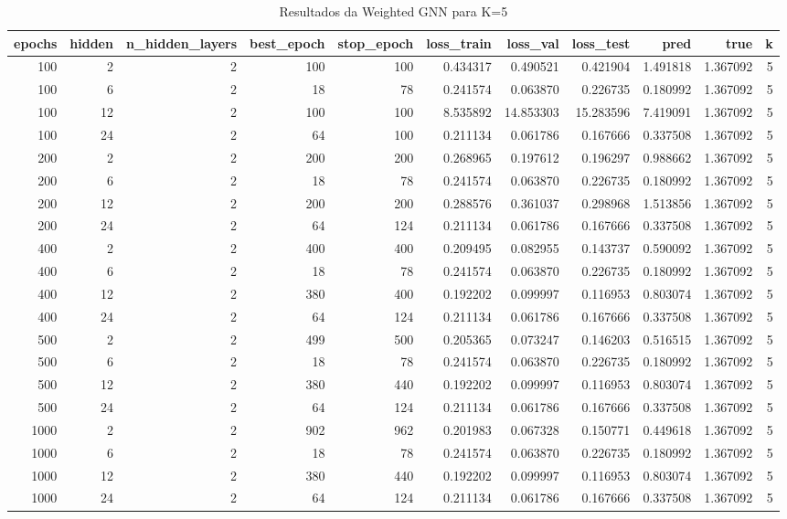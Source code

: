 \begin{table}
\caption{Resultados da Weighted GNN para K=5}
\label{tab:weighted_gnn_results_k5}
\begin{tabular}{rrrrrrrrrrr}
\toprule
epochs & hidden & n\_hidden\_layers & best\_epoch & stop\_epoch & loss\_train & loss\_val & loss\_test & pred & true & k \\
\midrule
100 & 2 & 2 & 100 & 100 & 0.434317 & 0.490521 & 0.421904 & 1.491818 & 1.367092 & 5 \\
100 & 6 & 2 & 18 & 78 & 0.241574 & 0.063870 & 0.226735 & 0.180992 & 1.367092 & 5 \\
100 & 12 & 2 & 100 & 100 & 8.535892 & 14.853303 & 15.283596 & 7.419091 & 1.367092 & 5 \\
100 & 24 & 2 & 64 & 100 & 0.211134 & 0.061786 & 0.167666 & 0.337508 & 1.367092 & 5 \\
200 & 2 & 2 & 200 & 200 & 0.268965 & 0.197612 & 0.196297 & 0.988662 & 1.367092 & 5 \\
200 & 6 & 2 & 18 & 78 & 0.241574 & 0.063870 & 0.226735 & 0.180992 & 1.367092 & 5 \\
200 & 12 & 2 & 200 & 200 & 0.288576 & 0.361037 & 0.298968 & 1.513856 & 1.367092 & 5 \\
200 & 24 & 2 & 64 & 124 & 0.211134 & 0.061786 & 0.167666 & 0.337508 & 1.367092 & 5 \\
400 & 2 & 2 & 400 & 400 & 0.209495 & 0.082955 & 0.143737 & 0.590092 & 1.367092 & 5 \\
400 & 6 & 2 & 18 & 78 & 0.241574 & 0.063870 & 0.226735 & 0.180992 & 1.367092 & 5 \\
400 & 12 & 2 & 380 & 400 & 0.192202 & 0.099997 & 0.116953 & 0.803074 & 1.367092 & 5 \\
400 & 24 & 2 & 64 & 124 & 0.211134 & 0.061786 & 0.167666 & 0.337508 & 1.367092 & 5 \\
500 & 2 & 2 & 499 & 500 & 0.205365 & 0.073247 & 0.146203 & 0.516515 & 1.367092 & 5 \\
500 & 6 & 2 & 18 & 78 & 0.241574 & 0.063870 & 0.226735 & 0.180992 & 1.367092 & 5 \\
500 & 12 & 2 & 380 & 440 & 0.192202 & 0.099997 & 0.116953 & 0.803074 & 1.367092 & 5 \\
500 & 24 & 2 & 64 & 124 & 0.211134 & 0.061786 & 0.167666 & 0.337508 & 1.367092 & 5 \\
1000 & 2 & 2 & 902 & 962 & 0.201983 & 0.067328 & 0.150771 & 0.449618 & 1.367092 & 5 \\
1000 & 6 & 2 & 18 & 78 & 0.241574 & 0.063870 & 0.226735 & 0.180992 & 1.367092 & 5 \\
1000 & 12 & 2 & 380 & 440 & 0.192202 & 0.099997 & 0.116953 & 0.803074 & 1.367092 & 5 \\
1000 & 24 & 2 & 64 & 124 & 0.211134 & 0.061786 & 0.167666 & 0.337508 & 1.367092 & 5 \\
\bottomrule
\end{tabular}
\end{table}
